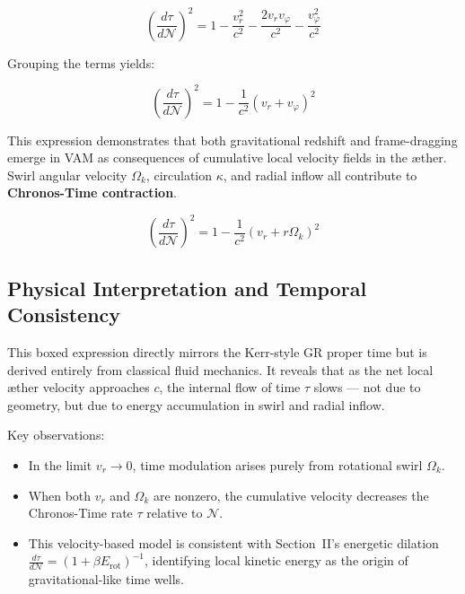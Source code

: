 \documentclass[preprint]{revtex4-2}
\begin{document}
\begin{equation}
 \left( \frac{d\tau}{d\mathcal{N}} \right)^2 = 1 - \frac{v_r^2}{c^2} - \frac{2v_r v_\varphi}{c^2} - \frac{v_\varphi^2}{c^2}
 \label{eq:VAM_proper_time}
\end{equation}

Grouping the terms yields:

\begin{equation}
 \left( \frac{d\tau}{d\mathcal{N}} \right)^2 = 1 - \frac{1}{c^2}(v_r + v_\varphi)^2
 \label{eq:VAM_proper_time_combined}
\end{equation}

This expression demonstrates that both gravitational redshift and frame-dragging emerge in VAM as consequences of cumulative local velocity fields in the æther. Swirl angular velocity \( \Omega_k \), circulation \( \kappa \), and radial inflow all contribute to \textbf{Chronos-Time contraction}.

\begin{equation}
 \boxed{\left( \frac{d\tau}{d\mathcal{N}} \right)^2 = 1 - \frac{1}{c^2}(v_r + r\Omega_k)^2}
 \label{eq:VAM_proper_time_final}
\end{equation}

\subsection{Physical Interpretation and Temporal Consistency}

This boxed expression directly mirrors the Kerr-style GR proper time but is derived entirely from classical fluid mechanics. It reveals that as the net local æther velocity approaches \( c \), the internal flow of time \( \tau \) slows — not due to geometry, but due to energy accumulation in swirl and radial inflow.

Key observations:

\begin{itemize}
 \item In the limit \( v_r \to 0 \), time modulation arises purely from rotational swirl \( \Omega_k \).
 \item When both \( v_r \) and \( \Omega_k \) are nonzero, the cumulative velocity decreases the Chronos-Time rate \( \tau \) relative to \( \mathcal{N} \).
 \item This velocity-based model is consistent with Section~II’s energetic dilation \( \frac{d\tau}{d\mathcal{N}} = (1 + \beta E_{\text{rot}})^{-1} \), identifying local kinetic energy as the origin of gravitational-like time wells.
\end{itemize}
\end{document}
